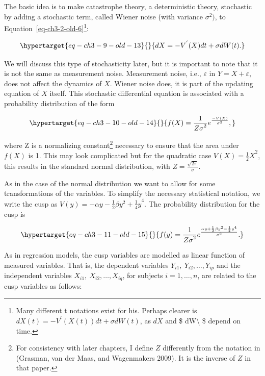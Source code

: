 \documentclass[
  letterpaper,
]{scrbook}
\begin{document}
The basic idea is to make catastrophe theory, a deterministic theory,
stochastic by adding a stochastic term, called Wiener noise (with
variance \(\sigma^{2})\), to Equation~\ref{eq-ch3-2-old-6}\footnote{Many
  different t notations exist for his. Perhaps clearer is
  \(dX(t) = - V^{'}\left( X(t) \right)dt + \sigma dW(t)\), as \(dX\) and
  \$ dW\textbackslash{} \$ depend on time.}:

\begin{equation}\protect\hypertarget{eq-ch3-9-old-13}{}{
dX = - V^{'}(X)dt + \sigma dW(t).}\label{eq-ch3-9-old-13}\end{equation}

We will discuss this type of stochasticity later, but it is important to
note that it is not the same as measurement noise. Measurement noise,
i.e., \(\varepsilon\) in \(Y = X + \varepsilon\), does not affect the
dynamics of \(X\). Wiener noise does, it is part of the updating
equation of \(X\) itself. This stochastic differential equation is
associated with a probability distribution of the form

\begin{equation}\protect\hypertarget{eq-ch3-10-old-14}{}{
f(X) = \frac{1}{{Z\sigma}^{2}}e^{\frac{- V(X)}{\sigma^{2}}},}\label{eq-ch3-10-old-14}\end{equation}

where Z is a normalizing constant\footnote{For consistency with later
  chapters, I define \(Z\) differently from the notation in (Grasman,
  van der Maas, and Wagenmakers 2009). It is the inverse of \(Z\) in
  that paper.} necessary to ensure that the area under \(f(X)\) is 1.
This may look complicated but for the quadratic case
\(V(X) = {\frac{1}{2}X}^{2}\), this results in the standard normal
distribution, with \(Z = \frac{\sqrt{2\pi}}{\sigma}\).

As in the case of the normal distribution we want to allow for some
transformations of the variables. To simplify the necessary statistical
notation, we write the cusp as
\(V(y) = {- \alpha y - \frac{1}{2}\beta y^{2} + \frac{1}{4}y}^{4}\). The
probability distribution for the cusp is

\begin{equation}\protect\hypertarget{eq-ch3-11-old-15}{}{
f(y) = \frac{1}{{Z\sigma}^{2}}e^{\frac{\alpha y + \frac{1}{2}\beta y^{2} - \frac{1}{4}y^{4}}{\sigma^{2}}}.}\label{eq-ch3-11-old-15}\end{equation}

As in regression models, the cusp variables are modelled as linear
function of measured variables. That is, the dependent variables
\(Y_{i1},\ Y_{i2},\ldots,Y_{ip}\) and the independent variables
\(X_{i1},\ X_{i2},\ldots,X_{iq}\), for subjects \(i = 1,\ldots,n\), are
related to the cusp variables as follows:
\end{document}
